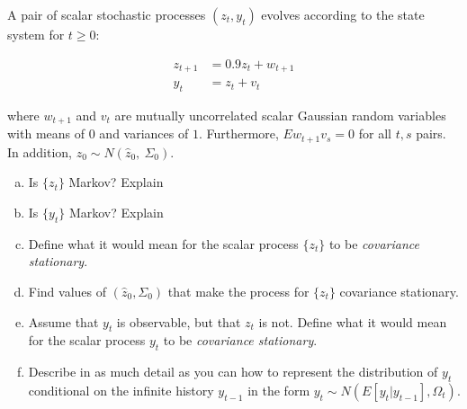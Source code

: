 \documentclass{homework}
\begin{document}
\begin{homeworkProblem}[Problem 2.24]

  A pair of scalar stochastic processes $(z_t, y_t)$ evolves according to the state system for $t \ge 0$:

  \begin{align*}
    z_{t+1} &= 0.9 z_t + w_{t+1} \\
    y_t &= z_t + v_t
  \end{align*}

  where $w_{t+1}$ and $v_t$ are mutually uncorrelated scalar Gaussian random variables with means of $0$ and variances of $1$. Furthermore, $Ew_{t+1}v_s = 0$ for all $t,s$ pairs. In addition, $z_0 \sim N(\hat{z}_0,\
  \Sigma_0).$

  \begin{enumerate}[a.]
    \item Is $\{z_t\}$ Markov? Explain
    \item Is $\{y_t\}$ Markov? Explain
    \item Define what it would mean for the scalar process $\{z_t\}$ to be \textit{covariance stationary}.
    \item Find values of $(\hat{z}_0, \Sigma_0)$ that make the process for $\{z_t\}$ covariance stationary.
    \item Assume that $y_t$ is observable, but that $z_t$ is not. Define what it would mean for the scalar process $y_t$ to be \textit{covariance stationary}.
    \item Describe in as much detail as you can how to represent the distribution of $y_t$ conditional on the infinite history $y_{t-1}$ in the form $y_t \sim N(E[y_t|y_{t-1}],\Omega_t)$.
  \end{enumerate}

  \vspace{.2in}

\end{homeworkProblem}
\end{document}
